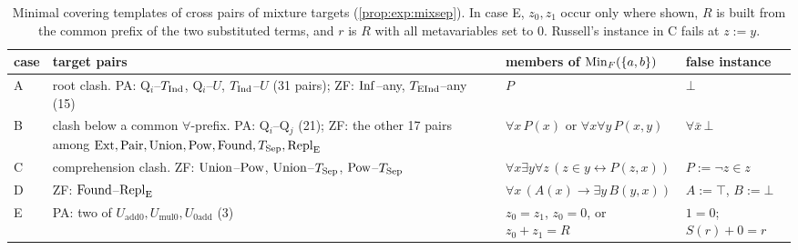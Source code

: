 \begin{table}[ht]
\centering\small
\begin{tabularx}{\textwidth}{@{}l>{\raggedright\arraybackslash}X>{\raggedright\arraybackslash}p{4.3cm}l@{}}
\toprule
case & target pairs & members of $\mathrm{Min}_F(\{a,b\})$ & false instance\\
\midrule
A & root clash. PA: Q$_i$--$T_{\mathrm{Ind}}$, Q$_i$--$U$, $T_{\mathrm{Ind}}$--$U$ (31 pairs); ZF: $\mathrm{Inf}$--any, $T_{\mathrm{EInd}}$--any (15) & $P$ & $\bot$\\
B & clash below a common $\forall$-prefix. PA: Q$_i$--Q$_j$ (21); ZF: the other 17 pairs among $\mathrm{Ext},\mathrm{Pair},\mathrm{Union},\mathrm{Pow},\mathrm{Found},T_{\mathrm{Sep}},\mathrm{Repl}_{\mathrm{E}}$ & $\forall x\,P(x)$ or $\forall x\forall y\,P(x,y)$ & $\forall\bar x\,\bot$\\
C & comprehension clash. ZF: $\mathrm{Union}$--$\mathrm{Pow}$, $\mathrm{Union}$--$T_{\mathrm{Sep}}$, $\mathrm{Pow}$--$T_{\mathrm{Sep}}$ & $\forall x\exists y\forall z\,(z\in y\leftrightarrow P(z,x))$ & $P:=\neg z\in z$\\
D & ZF: $\mathrm{Found}$--$\mathrm{Repl}_{\mathrm{E}}$ & $\forall x\,(A(x)\to\exists y\,B(y,x))$ & $A:=\top$, $B:=\bot$\\
E & PA: two of $U_{\mathrm{add0}},U_{\mathrm{mul0}},U_{\mathrm{0add}}$ (3) & $z_0=z_1$, $z_0=0$, or $z_0+z_1=R$ & $1=0$; $S(r)+0=r$\\
\bottomrule
\end{tabularx}
\caption{Minimal covering templates of cross pairs of mixture targets (\cref{prop:exp:mixsep}). In case E, $z_0,z_1$ occur only where shown, $R$ is built from the common prefix of the two substituted terms, and $r$ is $R$ with all metavariables set to $0$. Russell's instance in C fails at $z:=y$.}
\label{tab:exp:cases}
\end{table}

